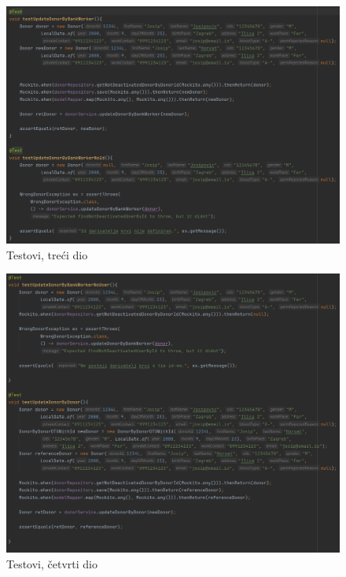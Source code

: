         		\begin{figure}[H]
                    \includegraphics[scale=0.6]{slike/Tests/test3.png}
        			\centering
        			\caption{Testovi, treći dio}
        			\label{fig:controller}
        		\end{figure}
        		\begin{figure}[H]
                    \includegraphics[scale=0.6]{slike/Tests/test4.png}
        			\centering
        			\caption{Testovi, četvrti dio}
        			\label{fig:controller}
        		\end{figure}
